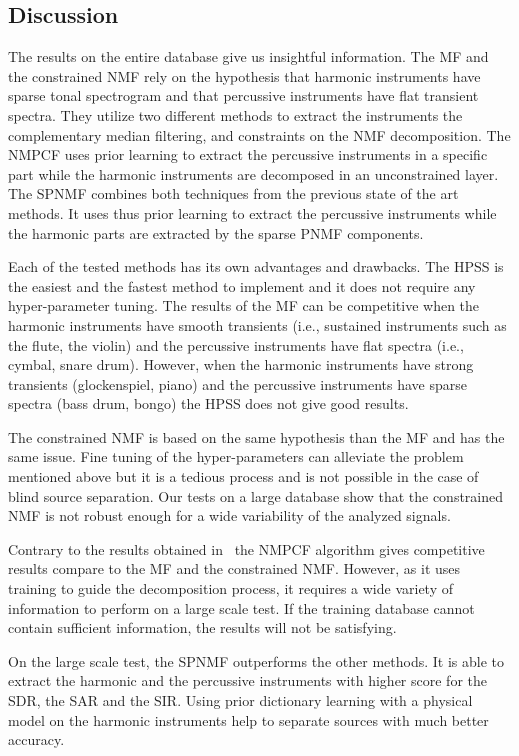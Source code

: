 \subsection{Discussion}
\label{discu}

The results on the entire database give us insightful information.
The MF and the constrained NMF rely on the hypothesis that harmonic instruments have sparse tonal spectrogram and that percussive instruments have flat transient spectra. They utilize two different methods to extract the instruments the complementary median filtering, and constraints on the NMF decomposition.
The NMPCF uses prior learning to extract the percussive instruments in a specific part while the harmonic instruments are decomposed in an unconstrained layer. 
The SPNMF combines both techniques from the previous state of the art methods. It uses thus prior learning to extract the percussive instruments while the harmonic parts are extracted by the sparse PNMF components.



Each of the tested methods has its own advantages and  drawbacks. The HPSS is the easiest and the fastest method to implement and it does not require any hyper-parameter tuning. The results of the MF can be competitive when the harmonic instruments have smooth transients (i.e., sustained instruments such as the flute, the violin) and the percussive instruments have flat spectra (i.e., cymbal, snare drum). However, when the harmonic instruments have strong transients (glockenspiel, piano) and the percussive instruments have sparse spectra (bass drum, bongo) the HPSS does not give good results. 

The constrained NMF is based on the same hypothesis than the MF and has the same issue. Fine tuning of the hyper-parameters can alleviate the problem mentioned above but it is a tedious process and is not possible in the case of blind source separation. Our tests on a large database show that the constrained NMF is not robust enough for a wide variability of the analyzed signals.

Contrary to the results obtained in~\cite{canadas2014percussive} the NMPCF algorithm gives competitive results compare to the MF and the constrained NMF. However, as it uses training to guide the decomposition process, it requires a wide variety of information to perform on a large scale test. If the training database cannot contain sufficient information, the results will not be satisfying. 

On the large scale test, the SPNMF outperforms the other methods. It is able to extract the harmonic and the percussive instruments with higher score for the SDR, the SAR and the SIR. Using prior dictionary learning with a physical model on the harmonic instruments help to separate sources with much better accuracy.

